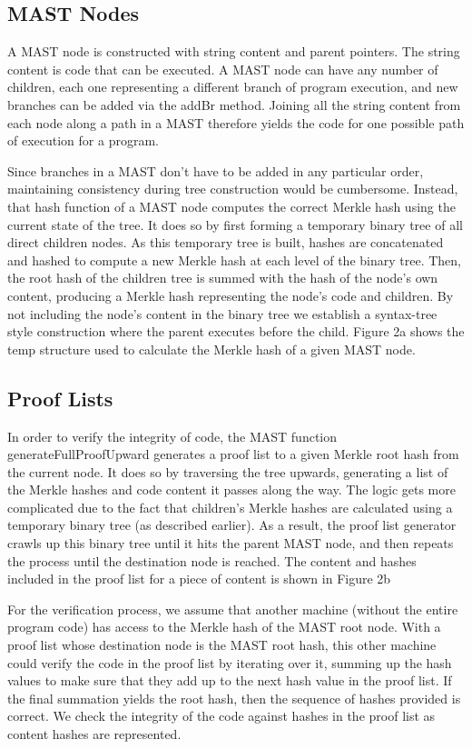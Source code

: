 \documentclass{vldb}
\begin{document}
\subsection{MAST Nodes}

A MAST node is constructed with string content and parent pointers.
The string content is code that can be executed. A MAST node can have
any number of children, each one representing a different branch of program
execution, and new branches can be added via the addBr method. Joining all the
string content from each node along a path in a MAST therefore yields the code
for one possible path of execution for a program.
 
Since branches in a MAST don’t have to be added in any particular order,
maintaining consistency during tree construction would be cumbersome. Instead,
that hash function of a MAST node computes the correct Merkle hash using the
current state of the tree. It does so by first forming a temporary binary tree
of all direct children nodes. As this temporary tree is built, hashes are
concatenated and hashed to compute a new Merkle hash at each level of the
binary tree. Then, the root hash of the children tree is summed with the hash
of the node’s own content, producing a Merkle hash representing the node's code
and children. By not including the node's content in the binary tree we
establish a syntax-tree style construction where the parent executes before the
child. Figure 2a shows the temp structure used to calculate the Merkle hash of
a given MAST node.

\subsection{Proof Lists}

In order to verify the integrity of code, the MAST function
generateFullProofUpward  generates a proof list to a given Merkle root hash
from the current node. It does so by traversing the tree upwards, generating a
list of the Merkle hashes and code content it passes along the way. The logic
gets more complicated due to the fact that children's Merkle hashes are
calculated using a temporary binary tree (as described earlier). As a result,
the proof list generator crawls up this binary tree until it hits the parent
MAST node, and then repeats the process until the destination node is reached.
The content and hashes included in the proof list for a piece of content is
shown in Figure 2b

For the verification process, we assume that another machine (without the
entire program code) has access to the Merkle hash of the MAST root node. With
a proof list whose destination node is the MAST root hash, this other machine
could verify the code in the proof list by iterating over it, summing up the
hash values to make sure that they add up to the next hash value in the proof
list. If the final summation yields the root hash, then the sequence of hashes
provided is correct. We check the integrity of the code against hashes in the
proof list as content hashes are represented.
\end{document}
